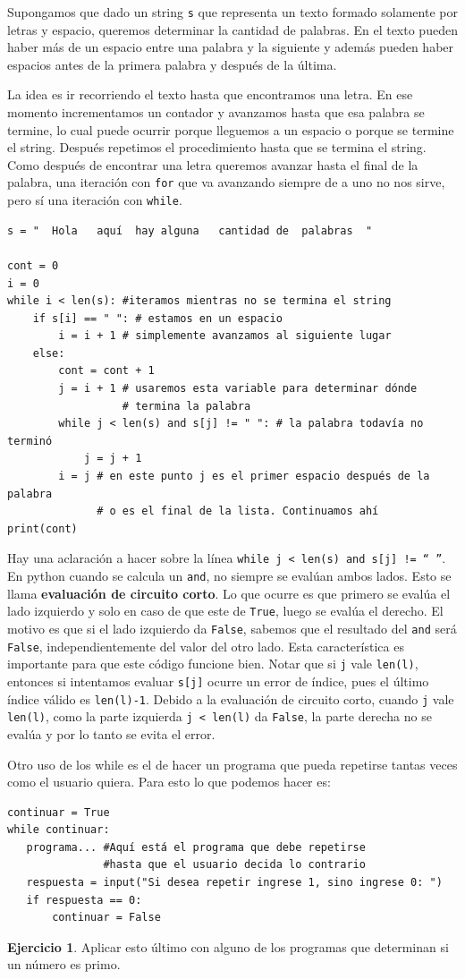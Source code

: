 \documentclass[a4paper, 12pt]{report}
\theoremstyle{definition}
\newtheorem{ejercicio}{Ejercicio}[section]
\begin{document}
Supongamos que dado un string {\tt s} que representa un texto formado solamente por letras y espacio, queremos determinar la cantidad de palabras. En el texto pueden haber más de un espacio entre una palabra y la siguiente y además pueden haber espacios antes de la primera palabra y después de la última.

La idea es ir recorriendo el texto hasta que encontramos una letra. En ese momento incrementamos un contador y avanzamos hasta que esa palabra se termine, lo cual puede ocurrir porque lleguemos a un espacio o porque se termine el string. Después repetimos el procedimiento hasta que se termina el string. Como después de encontrar una letra queremos avanzar hasta el final de la palabra, una iteración con {\tt for} que va avanzando siempre de a uno no nos sirve, pero sí una iteración con {\tt while}.
\begin{verbatim}
s = "  Hola   aquí  hay alguna   cantidad de  palabras  "

cont = 0
i = 0
while i < len(s): #iteramos mientras no se termina el string
    if s[i] == " ": # estamos en un espacio
        i = i + 1 # simplemente avanzamos al siguiente lugar
    else:
        cont = cont + 1
        j = i + 1 # usaremos esta variable para determinar dónde
                  # termina la palabra
        while j < len(s) and s[j] != " ": # la palabra todavía no terminó
            j = j + 1
        i = j # en este punto j es el primer espacio después de la palabra
              # o es el final de la lista. Continuamos ahí
print(cont)       
\end{verbatim}
Hay una aclaración a hacer sobre la línea {\tt while j < len(s) and s[j] != `` ''}. En python cuando se calcula un {\tt and}, no siempre se evalúan ambos lados. Esto se llama {\bf evaluación de circuito corto}. Lo que ocurre es que primero se evalúa el lado izquierdo y solo en caso de que este de {\tt True}, luego se evalúa el derecho. El motivo es que si el lado izquierdo da {\tt False}, sabemos que el resultado del {\tt and} será {\tt False}, independientemente del valor del otro lado. Esta característica es importante para que este código funcione bien. Notar que si {\tt j} vale {\tt len(l)}, entonces si intentamos evaluar {\tt s[j]} ocurre un error de índice, pues el último índice válido es {\tt len(l)-1}. Debido a la evaluación de circuito corto, cuando {\tt j} vale {\tt len(l)}, como la parte izquierda {\tt j < len(l)} da {\tt False}, la parte derecha no se evalúa y por lo tanto se evita el error.

Otro uso de los while es el de hacer un programa que pueda repetirse tantas veces como el usuario quiera. Para esto lo que podemos hacer es:
\begin{verbatim}
continuar = True
while continuar:
   programa... #Aquí está el programa que debe repetirse
               #hasta que el usuario decida lo contrario
   respuesta = input("Si desea repetir ingrese 1, sino ingrese 0: ")
   if respuesta == 0:
       continuar = False
\end{verbatim}
\begin{ejercicio}
	Aplicar esto último con alguno de los programas que determinan si un número es primo.
\end{ejercicio}
\end{document}

